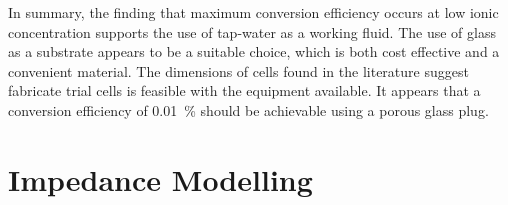 

    In summary, the finding that maximum conversion efficiency occurs at low ionic concentration supports the use of tap-water as a working fluid.
    The use of glass as a substrate appears to be a suitable choice, which is both cost effective and a convenient material.
    The dimensions of cells found in the literature suggest fabricate trial cells is feasible with the equipment available.
    It appears that a conversion efficiency of \SI{0.01}{\percent} should be achievable using a porous glass plug.



\section{Impedance Modelling}
  \label{sect:background_impedanceModelling}

